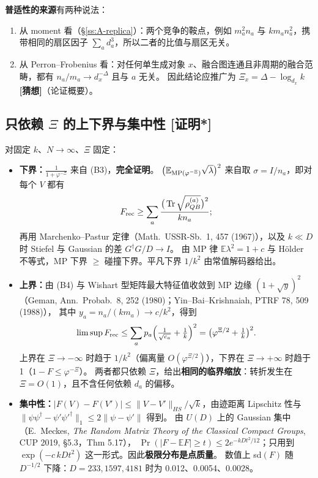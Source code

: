 \documentclass[11pt,a4paper,UTF8]{ctexart}
\newcommand{\Tr}{\operatorname{Tr}}
\newcommand{\E}{\mathbb{E}}
\newcommand{\Frec}{F_{\rm rec}}
\newcommand{\tagPs}{\texorpdfstring{\textcolor{cPs}{\textbf{[证明*]}}}{[证明*]}}
\newcommand{\tagC}{\texorpdfstring{\textcolor{cC}{\textbf{[猜想]}}}{[猜想]}}
\begin{document}
\textbf{普适性的来源}有两种说法：
\begin{enumerate}
  \item 从 moment 看（\S\ref{ss:A-replica}）：两个竞争的鞍点，例如 $m_a^2n_a$ 与 $km_an_a^2$，携带相同的扇区因子 $\sum_ad_a^3$，所以二者的比值与扇区无关。
  \item 从 Perron--Frobenius 看：对任何单生成对象 $x$、融合图连通且非周期的融合范畴，都有 $n_a/m_a\to d_x^{-\Delta}$ 且与 $a$ 无关。
  因此结论应推广为 $\Xi_x=\Delta-\log_{d_x}k$ \tagC（论证概要）。
\end{enumerate}

\subsection{只依赖 \texorpdfstring{$\Xi$}{Ξ} 的上下界与集中性 \tagPs}\label{ss:C-bounds}
对固定 $k$、$N\to\infty$、$\Xi$ 固定：
\begin{itemize}
  \item \textbf{下界：}$\tfrac1{1+\varphi^{-\Xi}}$ 来自 (B3)，\textbf{完全证明}。
  $\big(\E_{{\rm MP}(\varphi^{-\Xi})}\sqrt\lambda\big)^2$ 来自取 $\sigma=I/n_a$，即对每个 $V$ 都有
  \[\Frec\ge\sum_a\frac{\big(\Tr\sqrt{\rho^{(a)}_{QB}}\big)^2}{kn_a};\]
  再用 Marchenko--Pastur 定律（Math.\ USSR-Sb.\ 1, 457 (1967)），以及 $k\ll D$ 时 Stiefel 与 Gaussian 的差 $G^\dagger G/D\to I$。
  由 MP 律 $\E\lambda^2=1+c$ 与 Hölder 不等式，MP 下界 $\ge$ 碰撞下界。平凡下界 $1/k^2$ 由常值解码器给出。
  \item \textbf{上界：}由 (B4) 与 Wishart 型矩阵最大特征值收敛到 MP 边缘 $(1+\sqrt y)^2$（Geman, Ann.\ Probab.\ 8, 252 (1980)；Yin--Bai--Krishnaiah, PTRF 78, 509 (1988)），
  其中 $y_a=n_a/(km_a)\to c/k^2$，得到
  \[
  \limsup\Frec\le\sum_ap_a\Big(\tfrac1{\sqrt{c_a}}+\tfrac1k\Big)^2=\big(\varphi^{\Xi/2}+\tfrac1k\big)^2 .
  \]
  上界在 $\Xi\to-\infty$ 时趋于 $1/k^2$（偏离量 $O(\varphi^{\Xi/2})$），下界在 $\Xi\to+\infty$ 时趋于 1（$1-F\le\varphi^{-\Xi}$）。
  两者都只依赖 $\Xi$，给出\textbf{相同的临界缩放}：转折发生在 $\Xi=O(1)$，且不含任何依赖 $d_a$ 的偏移。
  \item \textbf{集中性：}$|F(V)-F(V')|\le\|V-V'\|_{HS}/\sqrt k$，由迹距离 Lipschitz 性与 $\|\psi\psi^\dagger-\psi'\psi'^\dagger\|_1\le2\|\psi-\psi'\|$ 得到。
  由 $U(D)$ 上的 Gaussian 集中（E.\ Meckes, \emph{The Random Matrix Theory of the Classical Compact Groups}, CUP 2019, \S5.3，Thm 5.17），
  $\Pr(|F-\E F|\ge t)\le2e^{-kDt^2/12}$；只用到 $\exp(-c\,kDt^2)$ 这一形式。因此\textbf{极限分布是点质量}。
  数值上 sd$(F)$ 随 $D^{-1/2}$ 下降：$D=233,1597,4181$ 时为 0.012、0.0054、0.0028。
\end{itemize}
\end{document}
